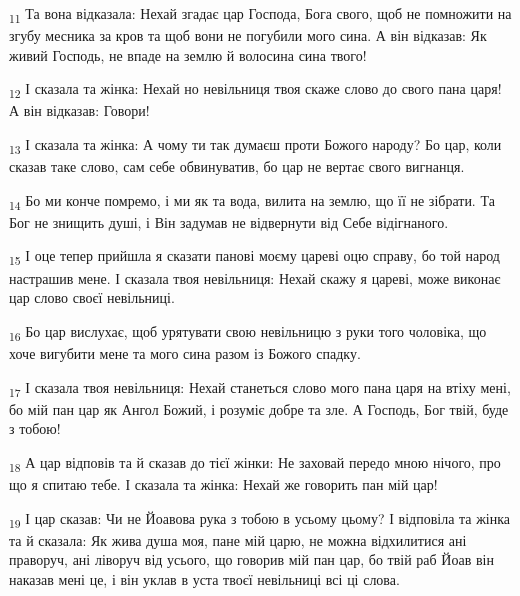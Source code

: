 \begin{tcolorbox}
\textsubscript{11} Та вона відказала: Нехай згадає цар Господа, Бога свого, щоб не помножити на згубу месника за кров та щоб вони не погубили мого сина. А він відказав: Як живий Господь, не впаде на землю й волосина сина твого!
\end{tcolorbox}
\begin{tcolorbox}
\textsubscript{12} І сказала та жінка: Нехай но невільниця твоя скаже слово до свого пана царя! А він відказав: Говори!
\end{tcolorbox}
\begin{tcolorbox}
\textsubscript{13} І сказала та жінка: А чому ти так думаєш проти Божого народу? Бо цар, коли сказав таке слово, сам себе обвинуватив, бо цар не вертає свого вигнанця.
\end{tcolorbox}
\begin{tcolorbox}
\textsubscript{14} Бо ми конче помремо, і ми як та вода, вилита на землю, що її не зібрати. Та Бог не знищить душі, і Він задумав не відвернути від Себе відігнаного.
\end{tcolorbox}
\begin{tcolorbox}
\textsubscript{15} І оце тепер прийшла я сказати панові моєму цареві оцю справу, бо той народ настрашив мене. І сказала твоя невільниця: Нехай скажу я цареві, може виконає цар слово своєї невільниці.
\end{tcolorbox}
\begin{tcolorbox}
\textsubscript{16} Бо цар вислухає, щоб урятувати свою невільницю з руки того чоловіка, що хоче вигубити мене та мого сина разом із Божого спадку.
\end{tcolorbox}
\begin{tcolorbox}
\textsubscript{17} І сказала твоя невільниця: Нехай станеться слово мого пана царя на втіху мені, бо мій пан цар як Ангол Божий, і розуміє добре та зле. А Господь, Бог твій, буде з тобою!
\end{tcolorbox}
\begin{tcolorbox}
\textsubscript{18} А цар відповів та й сказав до тієї жінки: Не заховай передо мною нічого, про що я спитаю тебе. І сказала та жінка: Нехай же говорить пан мій цар!
\end{tcolorbox}
\begin{tcolorbox}
\textsubscript{19} І цар сказав: Чи не Йоавова рука з тобою в усьому цьому? І відповіла та жінка та й сказала: Як жива душа моя, пане мій царю, не можна відхилитися ані праворуч, ані ліворуч від усього, що говорив мій пан цар, бо твій раб Йоав він наказав мені це, і він уклав в уста твоєї невільниці всі ці слова.
\end{tcolorbox}
